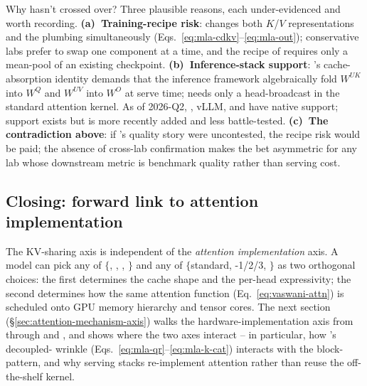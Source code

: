 Why hasn't  crossed over? Three plausible reasons, each
under-evidenced and worth recording. \textbf{(a)~Training-recipe
risk}:  changes both $K$/$V$ representations and the 
plumbing simultaneously (Eqs.~\eqref{eq:mla-cdkv}--\eqref{eq:mla-out});
conservative labs prefer to swap one component at a time, and the
 recipe of \citet{ainslie2023} requires only a mean-pool of an
existing checkpoint. \textbf{(b)~Inference-stack support}: 's
cache-absorption identity demands that the inference framework
algebraically fold $W^{UK}$ into $W^Q$ and $W^{UV}$ into $W^O$ at
serve time;  needs only a head-broadcast in the standard
attention kernel. As of 2026-Q2, , vLLM, and 
have native  support;  support exists but is more
recently added and less battle-tested. \textbf{(c)~The contradiction
above}: if 's quality story were uncontested, the recipe risk
would be paid; the absence of cross-lab confirmation makes the bet
asymmetric for any lab whose downstream metric is benchmark
quality rather than serving cost.

\subsection{Closing: forward link to attention implementation}
\label{sec:attn-summary}

The KV-sharing axis is independent of the \emph{attention
implementation} axis. A model can pick any of $\{$, , ,
$\}$ and any of $\{$standard, -1/2/3, $\}$ as
two orthogonal choices: the first determines the cache shape and
the per-head expressivity; the second determines how the same
attention function (Eq.~\eqref{eq:vaswani-attn}) is scheduled onto
GPU memory hierarchy and tensor cores. The next section
(\S\ref{sec:attention-mechanism-axis}) walks the
hardware-implementation axis from \citet{dao2022} through
\citet{shah2024} and \citet{yuan2025}, and shows where the two axes
interact -- in particular, how 's decoupled- wrinkle
(Eqs.~\eqref{eq:mla-qr}--\eqref{eq:mla-k-cat}) interacts with the
 block- pattern, and why  serving stacks
re-implement attention rather than reuse the off-the-shelf 
kernel.

